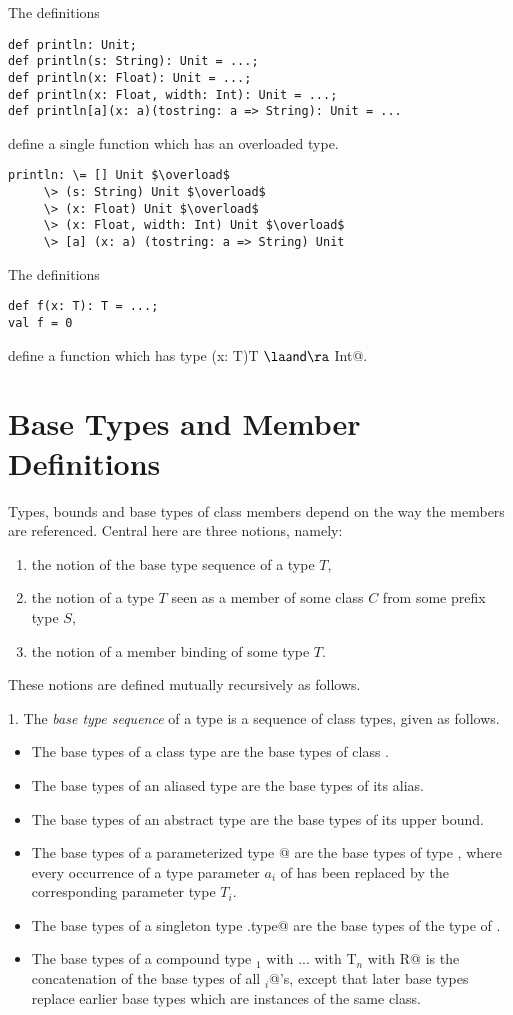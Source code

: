\documentclass[11pt]{report}
\begin{document}
\example The definitions
\begin{verbatim}
def println: Unit;
def println(s: String): Unit = ...;
def println(x: Float): Unit = ...;
def println(x: Float, width: Int): Unit = ...;
def println[a](x: a)(tostring: a => String): Unit = ...
\end{verbatim}
define a single function \verb@println@ which has an overloaded
type.
\begin{verbatim}
println: \= [] Unit $\overload$
	 \> (s: String) Unit $\overload$
	 \> (x: Float) Unit $\overload$
	 \> (x: Float, width: Int) Unit $\overload$
	 \> [a] (x: a) (tostring: a => String) Unit
\end{verbatim}

\example The definitions
\begin{verbatim}
def f(x: T): T = ...;
val f = 0
\end{verbatim}
define a function \verb@f@ which has type \verb@(x: T)T $\overload$ Int@.

\section{Base Types and Member Definitions}

Types, bounds and base types of class members depend on the way the
members are referenced.  Central here are three notions, namely:
\begin{enumerate}
\item the notion of the base type sequence of a type $T$,
\item the notion of a type $T$ seen as a member of some class $C$ from some 
      prefix type $S$,
\item the notion of a member binding of some type $T$.
\end{enumerate}
These notions are defined mutually recursively as follows.

1. The {\em base type sequence} of a type is a sequence of class types, 
given as follows.
\begin{itemize}
\item
The base types of a class type \verb@C@ are the base types of class
\verb@C@.
\item
The base types of an aliased type are the base types of its alias.
\item
The base types of an abstract type are the base types of its upper bound.
\item
The base types of a parameterized type \verb@C[T$_1$, ..., T$_n$]@ are the base types
of type \verb@C@, where every occurrence of a type parameter $a_i$ 
of \verb@C@ has been replaced by the corresponding parameter type $T_i$.
\item
The base types of a singleton type \verb@p.type@ are the base types of
the type of \verb@p@.
\item
The base types of a compound type
\verb@T$_1$ with ... with T$_n$ with {R}@ is the concatenation of the
base types of all \verb@T$_i$@'s, except that later base types replace
earlier base types which are instances of the same class.
\end{itemize}
\end{document}
